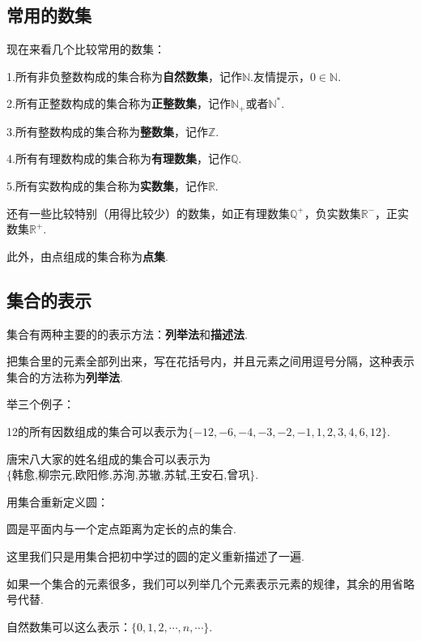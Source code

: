 \documentclass[lang=cn,math=cm,chinesefont=nofont,11pt,scheme=chinese,twocol]{elegantbook}
\begin{document}
\subsection{常用的数集}
现在来看几个比较常用的数集：

1.所有非负整数构成的集合称为\textbf{自然数集}，记作$\mathbb{N}$.友情提示，$0\in \mathbb{N}$.

2.所有正整数构成的集合称为\textbf{正整数集}，记作$\mathbb{N}_+$或者$\mathbb{N}^*$.

3.所有整数构成的集合称为\textbf{整数集}，记作$\mathbb{Z}$.

4.所有有理数构成的集合称为\textbf{有理数集}，记作$\mathbb{Q}$.

5.所有实数构成的集合称为\textbf{实数集}，记作$\mathbb{R}$.

还有一些比较特别（用得比较少）的数集，如正有理数集$\mathbb{Q}^+$，负实数集$\mathbb{R}^-$，正实数集$\mathbb{R}^+$.

此外，由点组成的集合称为\textbf{点集}.

\subsection{集合的表示}
集合有两种主要的的表示方法：\textbf{列举法}和\textbf{描述法}.

把集合里的元素全部列出来，写在花括号内，并且元素之间用逗号分隔，这种表示集合的方法称为\textbf{列举法}.

举三个例子：

\begin{example}
  12的所有因数组成的集合可以表示为$\{-12,-6,-4,-3,-2,-1,1,2,3,4,6,12\}$.
\end{example}
\begin{example}
  唐宋八大家的姓名组成的集合可以表示为$\{\text{韩愈,柳宗元,欧阳修,苏洵,苏辙,苏轼,王安石,曾巩}\}$.
\end{example}
\begin{example}
  用集合重新定义圆：
\end{example}
\begin{definition}[圆]
  圆是平面内与一个定点距离为定长的点的集合.
\end{definition}
这里我们只是用集合把初中学过的圆的定义重新描述了一遍.

如果一个集合的元素很多，我们可以列举几个元素表示元素的规律，其余的用省略号代替.

\begin{example}
  自然数集可以这么表示：$\{0,1,2,\cdots,n,\cdots\}$.
\end{example}
\end{document}
